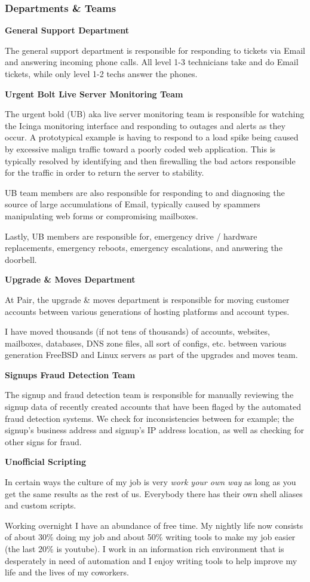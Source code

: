 \documentclass{article}
\begin{document}
\subsubsection{Departments \& Teams} 

\noindent
\textbf{General Support Department}

The general support department is responsible for responding to tickets via
Email and answering incoming phone calls. All level 1-3 technicians take and do
Email tickets, while only level 1-2 techs answer the phones. 

\noindent
\textbf{Urgent Bolt  Live Server Monitoring Team}

The urgent bold (UB) aka live server monitoring team is responsible for
watching the Icinga monitoring interface and responding to outages and alerts
as they occur. A prototypical example is having to respond to a load spike
being caused by excessive malign traffic toward a poorly coded web application.
This is typically resolved by identifying and then firewalling the bad actors
responsible for the traffic in order to return the server to stability.

UB team members are also responsible for responding to and diagnosing the
source of large accumulations of Email, typically caused by spammers
manipulating web forms or compromising mailboxes.

Lastly, UB members are responsible for, emergency drive / hardware
replacements, emergency reboots, emergency escalations, and answering the
doorbell.

\noindent
\textbf{Upgrade \& Moves Department}

At Pair, the upgrade \& moves department is responsible for moving customer
accounts between various generations of hosting platforms and account types.

I have moved thousands (if not tens of thousands) of accounts, websites,
mailboxes, databases, DNS zone files, all sort of configs, etc. between various
generation FreeBSD and Linux servers as part of the upgrades and moves team.

\noindent
\textbf{Signups Fraud Detection Team}

The signup and fraud detection team is responsible for manually reviewing the
signup data of recently created accounts that have been flaged by the automated
fraud detection systems. We check for inconsistencies between for example; the
signup's business address and signup's IP address location, as well as checking
for other signs for fraud.

\noindent
\textbf{Unofficial Scripting}

In certain ways the culture of my job is very \emph{work your own way} as long
as you get the same results as the rest of us. Everybody there has their own
shell aliases and custom scripts.

Working overnight I have an abundance of free time. My nightly life now
consists of about 30\% doing my job and about 50\% writing tools to make my job
easier (the last 20\% is youtube). I work in an information rich environment
that is desperately in need of automation and I enjoy writing tools to help
improve my life and the lives of my coworkers.
\end{document}
